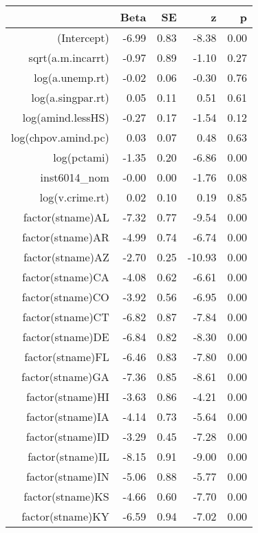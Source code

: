 \begin{table}[ht]
\centering
\begin{tabular}{rrrrr}
  \hline
 & Beta & SE & z & p \\ 
  \hline
(Intercept) & -6.99 & 0.83 & -8.38 & 0.00 \\ 
  sqrt(a.m.incarrt) & -0.97 & 0.89 & -1.10 & 0.27 \\ 
  log(a.unemp.rt) & -0.02 & 0.06 & -0.30 & 0.76 \\ 
  log(a.singpar.rt) & 0.05 & 0.11 & 0.51 & 0.61 \\ 
  log(amind.lessHS) & -0.27 & 0.17 & -1.54 & 0.12 \\ 
  log(chpov.amind.pc) & 0.03 & 0.07 & 0.48 & 0.63 \\ 
  log(pctami) & -1.35 & 0.20 & -6.86 & 0.00 \\ 
  inst6014\_nom & -0.00 & 0.00 & -1.76 & 0.08 \\ 
  log(v.crime.rt) & 0.02 & 0.10 & 0.19 & 0.85 \\ 
  factor(stname)AL & -7.32 & 0.77 & -9.54 & 0.00 \\ 
  factor(stname)AR & -4.99 & 0.74 & -6.74 & 0.00 \\ 
  factor(stname)AZ & -2.70 & 0.25 & -10.93 & 0.00 \\ 
  factor(stname)CA & -4.08 & 0.62 & -6.61 & 0.00 \\ 
  factor(stname)CO & -3.92 & 0.56 & -6.95 & 0.00 \\ 
  factor(stname)CT & -6.82 & 0.87 & -7.84 & 0.00 \\ 
  factor(stname)DE & -6.84 & 0.82 & -8.30 & 0.00 \\ 
  factor(stname)FL & -6.46 & 0.83 & -7.80 & 0.00 \\ 
  factor(stname)GA & -7.36 & 0.85 & -8.61 & 0.00 \\ 
  factor(stname)HI & -3.63 & 0.86 & -4.21 & 0.00 \\ 
  factor(stname)IA & -4.14 & 0.73 & -5.64 & 0.00 \\ 
  factor(stname)ID & -3.29 & 0.45 & -7.28 & 0.00 \\ 
  factor(stname)IL & -8.15 & 0.91 & -9.00 & 0.00 \\ 
  factor(stname)IN & -5.06 & 0.88 & -5.77 & 0.00 \\ 
  factor(stname)KS & -4.66 & 0.60 & -7.70 & 0.00 \\ 
  factor(stname)KY & -6.59 & 0.94 & -7.02 & 0.00 \\ 

\end{tabular}
\end{table}
